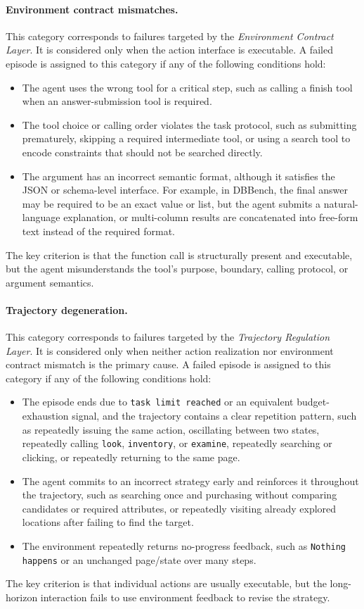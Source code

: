 \paragraph{Environment contract mismatches.}
This category corresponds to failures targeted by the \emph{Environment Contract Layer}. It is considered only when the action interface is executable. A failed episode is assigned to this category if any of the following conditions hold:
\begin{itemize}
    \item The agent uses the wrong tool for a critical step, such as calling a finish tool when an answer-submission tool is required.
    \item The tool choice or calling order violates the task protocol, such as submitting prematurely, skipping a required intermediate tool, or using a search tool to encode constraints that should not be searched directly.
    \item The argument has an incorrect semantic format, although it satisfies the JSON or schema-level interface. For example, in DBBench, the final answer may be required to be an exact value or list, but the agent submits a natural-language explanation, or multi-column results are concatenated into free-form text instead of the required format.
\end{itemize}
The key criterion is that the function call is structurally present and executable, but the agent misunderstands the tool's purpose, boundary, calling protocol, or argument semantics.

\paragraph{Trajectory degeneration.}
This category corresponds to failures targeted by the \emph{Trajectory Regulation Layer}. It is considered only when neither action realization nor environment contract mismatch is the primary cause. A failed episode is assigned to this category if any of the following conditions hold:
\begin{itemize}
    \item The episode ends due to \texttt{task limit reached} or an equivalent budget-exhaustion signal, and the trajectory contains a clear repetition pattern, such as repeatedly issuing the same action, oscillating between two states, repeatedly calling \texttt{look}, \texttt{inventory}, or \texttt{examine}, repeatedly searching or clicking, or repeatedly returning to the same page.
    \item The agent commits to an incorrect strategy early and reinforces it throughout the trajectory, such as searching once and purchasing without comparing candidates or required attributes, or repeatedly visiting already explored locations after failing to find the target.
    \item The environment repeatedly returns no-progress feedback, such as \texttt{Nothing happens} or an unchanged page/state over many steps.
\end{itemize}
The key criterion is that individual actions are usually executable, but the long-horizon interaction fails to use environment feedback to revise the strategy.

